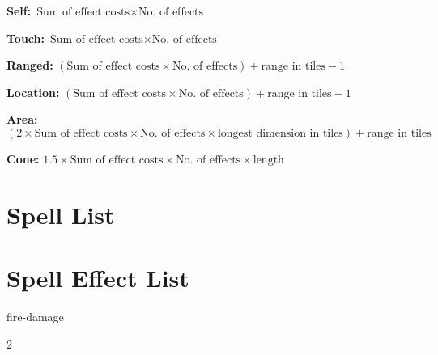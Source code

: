 \begin{multicols*}{2}
    \noindent
    \textbf{Self:} $\text{Sum of effect costs} \times \text{No. of effects}$

    \noindent
    \textbf{Touch:} $\text{Sum of effect costs} \times \text{No. of effects}$

    \noindent
    \textbf{Ranged:} $(\text{Sum of effect costs} \times \text{No. of effects}) + \text{range in tiles} - 1$

    \noindent
    \textbf{Location:} $(\text{Sum of effect costs} \times \text{No. of effects}) + \text{range in tiles} - 1$

    \noindent
    \textbf{Area:} $(2 \times \text{Sum of effect costs} \times \text{No. of effects} \times \text{longest dimension in tiles}) + \text{range in tiles}$

    \noindent
    \textbf{Cone:} $1.5 \times \text{Sum of effect costs} \times \text{No. of effects} \times \text{length}$

    \section{Spell List}

    \section{Spell Effect List}
    {fire-damage}

\end{multicols*}{2}
